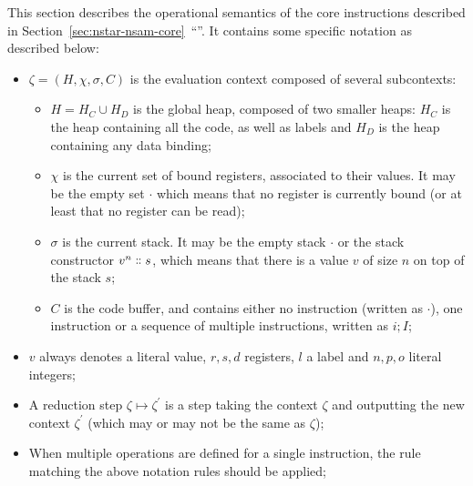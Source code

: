 This section describes the operational semantics of the core instructions described in Section~\ref{sec:nstar-nsam-core}~``''. It contains some specific notation as described below:
\begin{itemize}
  \item $\zeta = (H, \chi, \sigma, C)$ is the evaluation context composed of several subcontexts:
        \begin{itemize}
          \item $H = H_{C} \cup H_{D}$ is the global heap, composed of two smaller heaps: $H_{C}$ is the heap containing all the code, as well as labels and $H_{D}$ is the heap containing any data binding;
          \item $\chi$ is the current set of bound registers, associated to their values. It may be the empty set $\cdot$ which means that no register is currently bound (or at least that no register can be read);
          \item $\sigma$ is the current stack. It may be the empty stack $\cdot$ or the stack constructor $v^{n} \dblcolon s$, which means that there is a value $v$ of size $n$ on top of the stack $s$;
          \item $C$ is the code buffer, and contains either no instruction (written as $\cdot$), one instruction or a sequence of multiple instructions, written as $i; I$;
        \end{itemize}
  \item $v$ always denotes a literal value, $r, s, d$ registers, $l$ a label and $n, p, o$ literal integers;
  \item A reduction step $\zeta \mapsto \zeta^{\prime}$ is a step taking the context $\zeta$ and outputting the new context $\zeta^{\prime}$ (which may or may not be the same as $\zeta$);
  \item When multiple operations are defined for a single instruction, the rule matching the above notation rules should be applied;
\end{itemize}

